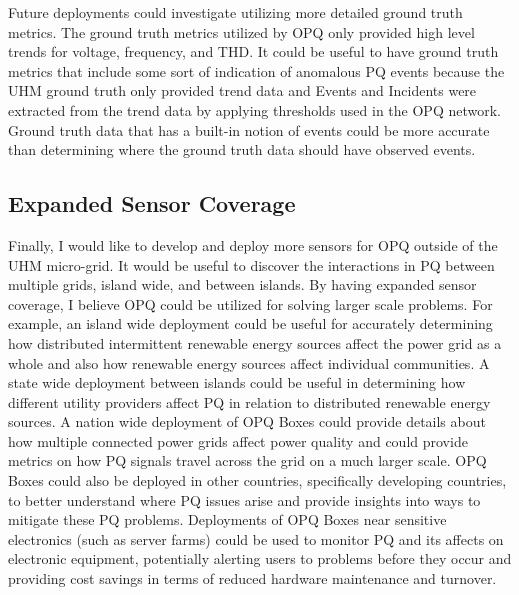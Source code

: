 Future deployments could investigate utilizing more detailed ground truth metrics. The ground truth metrics utilized by OPQ only provided high level trends for voltage, frequency, and THD. It could be useful to have ground truth metrics that include some sort of indication of anomalous PQ events because the UHM ground truth only provided trend data and Events and Incidents were extracted from the trend data by applying thresholds used in the OPQ network. Ground truth data that has a built-in notion of events could be more accurate than determining where the ground truth data should have observed events.

\subsection{Expanded Sensor Coverage}\label{subsec:expanded-sensor-coverage}
Finally, I would like to develop and deploy more sensors for OPQ outside of the UHM micro-grid. It would be useful to discover the interactions in PQ between multiple grids, island wide, and between islands. By having expanded sensor coverage, I believe OPQ could be utilized for solving larger scale problems. For example, an island wide deployment could be useful for accurately determining how distributed intermittent renewable energy sources affect the power grid as a whole and also how renewable energy sources affect individual communities. A state wide deployment between islands could be useful in determining how different utility providers affect PQ in relation to distributed renewable energy sources. A nation wide deployment of OPQ Boxes could provide details about how multiple connected power grids affect power quality and could provide metrics on how PQ signals travel across the grid on a much larger scale. OPQ Boxes could also be deployed in other countries, specifically developing countries, to better understand where PQ issues arise and provide insights into ways to mitigate these PQ problems. Deployments of OPQ Boxes near sensitive electronics (such as server farms) could be used to monitor PQ and its affects on electronic equipment, potentially alerting users to problems before they occur and providing cost savings in terms of reduced hardware maintenance and turnover.


